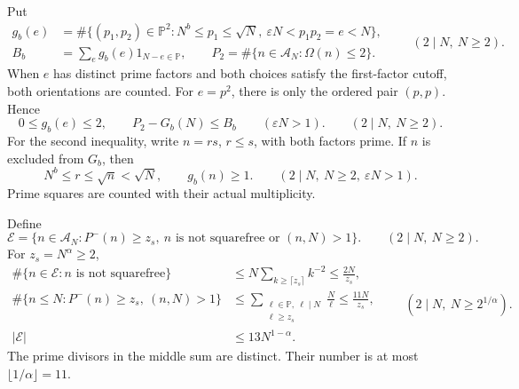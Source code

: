 Put
\begin{equation}\label{eq:source-bad-count}
\begin{aligned}
 g_b(e)&=\#\{(p_1,p_2)\in\mathbb P^2:
       N^b\le p_1\le\sqrt N,\ \varepsilon N<p_1p_2=e<N\},\\
 B_b&=\sum_e g_b(e)1_{N-e\in\mathbb P},\qquad
 P_2=\#\{n\in\mathcal A_N:\Omega(n)\le2\}.
\end{aligned}
\qquad(2\mid N,\ N\ge2).
\end{equation}
When \(e\) has distinct prime factors and both choices satisfy the
first-factor cutoff, both orientations are counted. For \(e=p^2\), there
is only the ordered pair \((p,p)\).
Hence
\begin{equation}\label{eq:source-multiplicity}
 0\le g_b(e)\le2,\qquad P_2-G_b(N)\le B_b
 \qquad(\varepsilon N>1).
\qquad(2\mid N,\ N\ge2).
\end{equation}
For the second inequality, write \(n=rs\), \(r\le s\), with both
factors prime.
If \(n\) is excluded from \(G_b\), then
\begin{equation}\label{eq:source-excluded-factor}
 N^b\le r\le\sqrt n<\sqrt N,\qquad g_b(n)\ge1.
\qquad(2\mid N,\ N\ge2,\ \varepsilon N>1).
\end{equation}
Prime squares are counted with their actual multiplicity.

Define
\begin{equation}\label{eq:source-exceptional-set}
 \mathcal E=\{n\in\mathcal A_N:P^-(n)\ge z_s,
       \ n\text{ is not squarefree or }(n,N)>1\}.
\qquad(2\mid N,\ N\ge2).
\end{equation}
For \(z_s=N^\alpha\ge2\),
\begin{equation}\label{eq:source-exceptional-size}
\begin{aligned}
 \#\{n\in\mathcal E:n\text{ is not squarefree}\}
 &\le N\sum_{k\ge\lceil z_s\rceil}k^{-2}\le\frac{2N}{z_s},\\
 \#\{n\le N:P^-(n)\ge z_s,\ (n,N)>1\}
 &\le\sum_{\substack{\ell\in\mathbb P,\ \ell\mid N\\\ell\ge z_s}}\frac N\ell
 \le\frac{11N}{z_s},\\
 |\mathcal E|&\le13N^{1-\alpha}.
\end{aligned}
\qquad(2\mid N,\ N\ge2^{1/\alpha}).
\end{equation}
The prime divisors in the middle sum are distinct.
Their number is at most
\(\lfloor1/\alpha\rfloor=11\).

